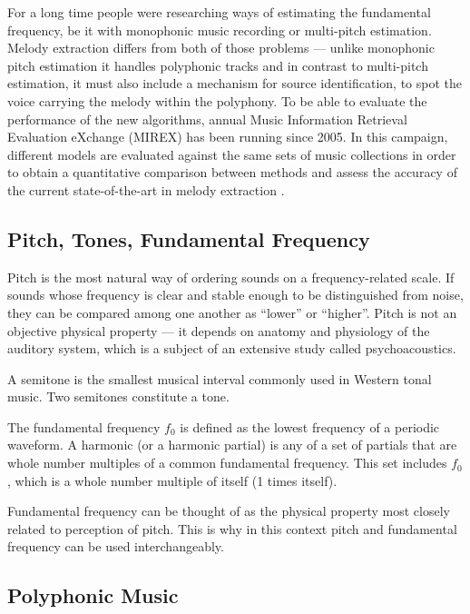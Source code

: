 For a long time people were researching ways of estimating the fundamental frequency, be it with monophonic music recording or multi-pitch estimation. Melody extraction differs from both of those problems — unlike monophonic pitch estimation it handles polyphonic tracks and in contrast to multi-pitch estimation, it must also include a mechanism for source identification, to spot the voice carrying the melody within the polyphony.
To be able to evaluate the performance of the new algorithms, annual Music Information Retrieval Evaluation eXchange (MIREX) has been running since 2005. In this campaign, different models are evaluated against the same sets of music collections in order to obtain a quantitative comparison between methods and assess the accuracy of the current state-of-the-art in melody extraction \cite{comparison}.

\vspace{10pt}

\subsection{Pitch, Tones, Fundamental Frequency}

Pitch is the most natural way of ordering sounds on a frequency-related scale. If sounds whose frequency is clear and stable enough to be distinguished from noise, they can be compared among  one another as “lower” or “higher”. Pitch is not an objective physical property — it depends on anatomy and physiology of the auditory system, which is a subject of an extensive study called psychoacoustics. 

A semitone is the smallest musical interval commonly used in Western tonal music. Two semitones constitute a tone.

The fundamental frequency $f_{\text{0}}$ is defined as the lowest frequency of a periodic waveform. A harmonic (or a harmonic partial) is any of a set of partials that are whole number multiples of a common fundamental frequency. This set includes $f_{0}$, which is a whole number multiple of itself (1 times itself).

Fundamental frequency can be thought of as the physical property most closely related to perception of pitch. This is why in this context pitch and fundamental frequency can be used interchangeably.

\vspace{10pt}

\subsection{Polyphonic Music}


